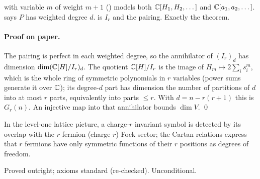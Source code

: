 \begin{dictionary}
 with variable $m$ of weight $m+1$ () models both ${\mathbb{C}}[H_1,H_2,\dots]$ and ${\mathbb{C}}[a_1,a_2,\dots]$.
 says $P$ has weighted degree $d$.  is $I_r$ and  the pairing.
Exactly the theorem.
\end{dictionary}

\paragraph{Proof on paper.} The pairing is perfect in each weighted degree, so the annihilator of $(I_r)_d$ has dimension
$\dim({\mathbb{C}}[H]/I_r)_d$. The quotient ${\mathbb{C}}[H]/I_r$ is the image of $H_m\mapsto2\sum_is_i^m$, which is the whole ring of symmetric polynomials in $r$
variables (power sums generate it over ${\mathbb{C}}$); its degree-$d$ part has dimension the number of partitions of $d$ into at most $r$ parts, equivalently
into parts $\le r$. With $d=n-r(r+1)$ this is $G_r(n)$. An injective map into that
annihilator bounds $\dim V$. \qed

\begin{physics}
In the level-one lattice picture, a charge-$r$ invariant symbol is detected by its overlap with the $r$-fermion (charge $r$) Fock sector; the
Cartan relations express that $r$ fermions have only symmetric functions of their $r$ positions as degrees of freedom.
\end{physics}

\begin{status}
Proved outright; axioms standard (re-checked). Unconditional.
\end{status}

